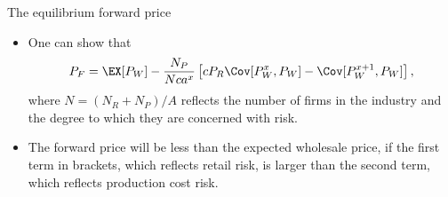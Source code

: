 {The equilibrium forward price}
\begin{itemize}
\item<1-> One can show that
$$
P_F=\EX[P_W]-\frac{N_P}{Nca^x}\left[cP_R\Cov[P_W^{x}, P_W]-\Cov[P_W^{x+1}, P_W]\right],
$$
where $N=(N_R+N_P)/A$ reflects the number of firms in the industry and the degree to which they are concerned with risk.
\item<2-> The forward price will be less than the expected wholesale price, if the first term in brackets, which reflects retail risk, is
larger than the second term, which reflects production cost risk.
\end{itemize}





